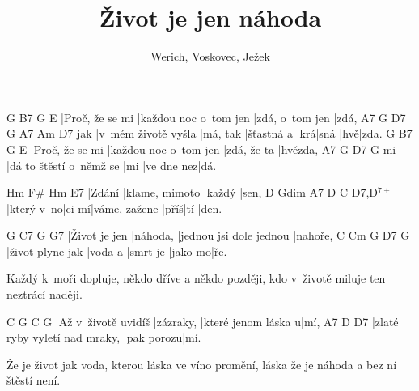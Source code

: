 \documentclass{song}
\title{Život je jen náhoda}
\author{Werich, Voskovec, Ježek}
\begin{document}
\strophe
G               B7                    G               E
|Proč, že se mi |každou noc o~tom jen |zdá, o~tom jen |zdá,
    A7                  G        D7         G   A7   Am  D7
jak |v~mém životě vyšla |má, tak |šťastná a |krá|sná |hvě|zda.
G               B7                    G           E
|Proč, že se mi |každou noc o~tom jen |zdá, že ta |hvězda,
   A7                      G   D7         G
mi |dá to štěstí o~němž se |mi |ve dne nez|dá.
\endstrophe

\strophe
Hm     F\#            Hm     E7
|Zdání |klame, mimoto |každý |sen,
D          Gdim  A7            D    C   D7,D$^{7+}$
|který v~no|ci mí|váme, zažene |příš|tí |den.
\endstrophe


G             C7       G                       G7
|Život je jen |náhoda, |jednou jsi dole jednou |nahoře,
C                Cm      G        D7      G
|život plyne jak |voda a |smrt je |jako mo|ře.
\endstrophe

Každý k~moři dopluje, někdo dříve a někdo později,
kdo v~životě miluje ten neztrácí naději.
\endstrophe

\strophe
C                   G         C                   G
|Až v~životě uvidíš |zázraky, |které jenom láska u|mí,
A7                            D          D7
|zlaté ryby vyletí nad mraky, |pak porozu|mí.
\endstrophe

Že je život jak voda, kterou láska ve víno promění,
láska že je náhoda a bez ní štěstí není.
\endstrophe
\end{document}
